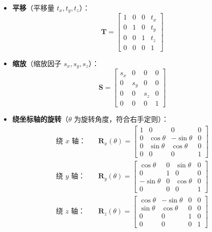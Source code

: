 \documentclass[12pt]{article}
\begin{document}
\begin{itemize}
    \item \textbf{平移}（平移量 $t_x, t_y, t_z$）：
    \[
    \mathbf{T} = \begin{bmatrix}
        1 & 0 & 0 & t_x \\
        0 & 1 & 0 & t_y \\
        0 & 0 & 1 & t_z \\
        0 & 0 & 0 & 1
    \end{bmatrix}
    \]
    
    \item \textbf{缩放}（缩放因子 $s_x, s_y, s_z$）：
    \[
    \mathbf{S} = \begin{bmatrix}
        s_x & 0   & 0   & 0 \\
        0   & s_y & 0   & 0 \\
        0   & 0   & s_z & 0 \\
        0   & 0   & 0   & 1
    \end{bmatrix}
    \]
    
    \item \textbf{绕坐标轴的旋转}（$\theta$ 为旋转角度，符合右手定则）：
    \begin{align*}
        \text{绕 $x$ 轴：} & \quad \mathbf{R}_x(\theta) = \begin{bmatrix}
            1 & 0 & 0 & 0 \\
            0 & \cos\theta & -\sin\theta & 0 \\
            0 & \sin\theta & \cos\theta & 0 \\
            0 & 0 & 0 & 1
        \end{bmatrix} \\
        \text{绕 $y$ 轴：} & \quad \mathbf{R}_y(\theta) = \begin{bmatrix}
            \cos\theta & 0 & \sin\theta & 0 \\
            0 & 1 & 0 & 0 \\
            -\sin\theta & 0 & \cos\theta & 0 \\
            0 & 0 & 0 & 1
        \end{bmatrix} \\
        \text{绕 $z$ 轴：} & \quad \mathbf{R}_z(\theta) = \begin{bmatrix}
            \cos\theta & -\sin\theta & 0 & 0 \\
            \sin\theta & \cos\theta & 0 & 0 \\
            0 & 0 & 1 & 0 \\
            0 & 0 & 0 & 1
        \end{bmatrix}
    \end{align*}
\end{itemize}
\end{document}
